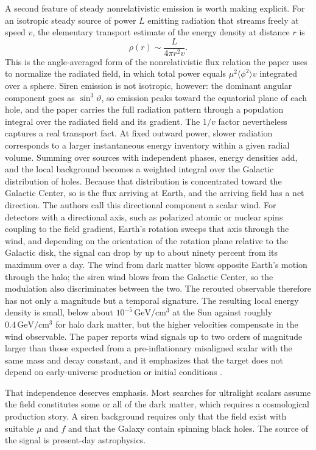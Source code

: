 \documentclass[11pt]{article}
\begin{document}
A second feature of steady nonrelativistic emission is worth making explicit. For an isotropic steady source of power $L$ emitting radiation that streams freely at speed $v$, the elementary transport estimate of the energy density at distance $r$ is
\begin{equation}
\rho(r) \sim \frac{L}{4\pi r^{2} v}.
\end{equation}
This is the angle-averaged form of the nonrelativistic flux relation the paper uses to normalize the radiated field, in which total power equals $\mu^{2}\langle\phi^{2}\rangle v$ integrated over a sphere. Siren emission is not isotropic, however: the dominant angular component goes as $\sin^{3}\vartheta$, so emission peaks toward the equatorial plane of each hole, and the paper carries the full radiation pattern through a population integral over the radiated field and its gradient. The $1/v$ factor nevertheless captures a real transport fact. At fixed outward power, slower radiation corresponds to a larger instantaneous energy inventory within a given radial volume. Summing over sources with independent phases, energy densities add, and the local background becomes a weighted integral over the Galactic distribution of holes. Because that distribution is concentrated toward the Galactic Center, so is the flux arriving at Earth, and the arriving field has a net direction. The authors call this directional component a scalar wind. For detectors with a directional axis, such as polarized atomic or nuclear spins coupling to the field gradient, Earth's rotation sweeps that axis through the wind, and depending on the orientation of the rotation plane relative to the Galactic disk, the signal can drop by up to about ninety percent from its maximum over a day. The wind from dark matter blows opposite Earth's motion through the halo; the siren wind blows from the Galactic Center, so the modulation also discriminates between the two. The rerouted observable therefore has not only a magnitude but a temporal signature. The resulting local energy density is small, below about $10^{-5}\,\mathrm{GeV/cm^{3}}$ at the Sun against roughly $0.4\,\mathrm{GeV/cm^{3}}$ for halo dark matter, but the higher velocities compensate in the wind observable. The paper reports wind signals up to two orders of magnitude larger than those expected from a pre-inflationary misaligned scalar with the same mass and decay constant, and it emphasizes that the target does not depend on early-universe production or initial conditions \cite{GavilanMartin2026}.

That independence deserves emphasis. Most searches for ultralight scalars assume the field constitutes some or all of the dark matter, which requires a cosmological production story. A siren background requires only that the field exist with suitable $\mu$ and $f$ and that the Galaxy contain spinning black holes. The source of the signal is present-day astrophysics.
\end{document}
